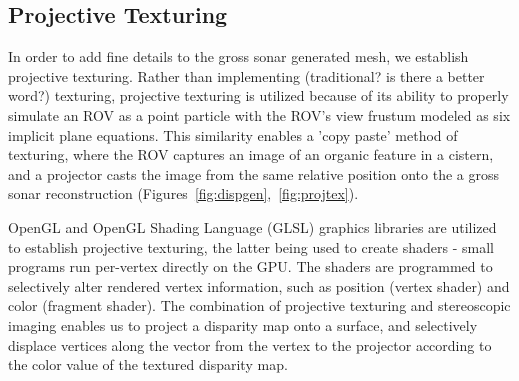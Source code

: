 \documentclass[a4paper,twoside]{article}
\begin{document}
\noindent 

\subsection{Projective Texturing}




\noindent In order to add fine details to the gross sonar generated mesh, we establish projective texturing. Rather than implementing (traditional? is there a better word?) texturing, projective texturing is utilized because of its ability to properly simulate an ROV as a point particle with the ROV's view frustum modeled as six implicit plane equations. This similarity enables a 'copy paste' method of texturing, where the ROV captures an image of an organic feature in a cistern, and a projector casts the image from the same relative position onto the a gross sonar reconstruction (Figures~\ref{fig:dispgen},~\ref{fig:projtex}). 

OpenGL and OpenGL Shading Language (GLSL) graphics libraries are utilized to establish projective texturing, the latter being used to create shaders - small programs run per-vertex directly on the GPU. The shaders are programmed to selectively alter rendered vertex information, such as position (vertex shader) and color (fragment shader). The combination of projective texturing and stereoscopic imaging enables us to project a disparity map onto a surface, and selectively displace vertices along the vector from the vertex to the projector according to the color value of the textured disparity map. 
\end{document}
